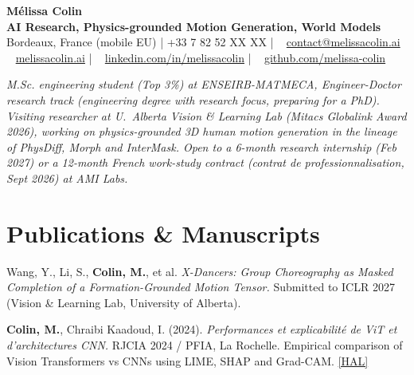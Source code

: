 \documentclass[10pt, letterpaper]{article}
\providecommand{\myphone}{+33 7 82 52 XX XX}
\begin{document}
\small

\begin{center}
    {\fontsize{20}{20}\selectfont \textbf{\color{MyRed}Mélissa Colin}} \\[2pt]
    {\footnotesize \textbf{AI Research, Physics-grounded Motion Generation, World Models}} \\[3pt]
    \scriptsize{
    \faMapMarker* Bordeaux, France (mobile EU) \quad|\quad
    \faPhone* \myphone{} \quad|\quad
    \faEnvelope~ \href{mailto:contact@melissacolin.ai}{contact@melissacolin.ai} \\
    \faGlobe~ \href{https://melissacolin.ai}{melissacolin.ai} \quad|\quad
    \faLinkedin~ \href{https://www.linkedin.com/in/melissacolin/}{linkedin.com/in/melissacolin} \quad|\quad
    \faGithub~ \href{https://github.com/melissa-colin}{github.com/melissa-colin}
    }
\end{center}

\vspace{2pt}
{\footnotesize
\textit{M.Sc. engineering student (Top 3\%) at ENSEIRB-MATMECA, Engineer-Doctor research track (engineering degree with research focus, preparing for a PhD). Visiting researcher at U.~Alberta Vision \& Learning Lab (Mitacs Globalink Award 2026), working on physics-grounded 3D human motion generation in the lineage of PhysDiff, Morph and InterMask. Open to a 6-month research internship (Feb 2027) or a 12-month French work-study contract (contrat de professionnalisation, Sept 2026) at AMI Labs.}}

\section{Publications \& Manuscripts}

Wang, Y., Li, S., \textbf{Colin, M.}, et al. \textit{X-Dancers: Group Choreography as Masked Completion of a Formation-Grounded Motion Tensor.} Submitted to ICLR 2027 (Vision \& Learning Lab, University of Alberta).

\vspace{1pt}

\textbf{Colin, M.}, Chraibi Kaadoud, I. (2024). \textit{Performances et explicabilité de ViT et d'architectures CNN.} RJCIA 2024 / PFIA, La Rochelle. Empirical comparison of Vision Transformers vs CNNs using LIME, SHAP and Grad-CAM. \href{https://hal.science/hal-04641791}{[HAL]}
\end{document}

